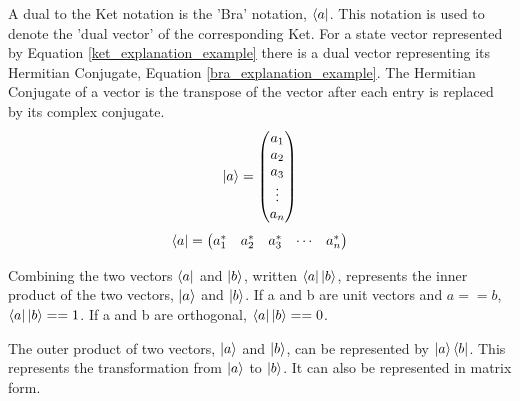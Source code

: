 A dual to the Ket notation is the 'Bra' notation, $\left\langle{a}\right\vert$.
This notation is used to denote the 'dual vector' of the corresponding Ket.
For a state vector represented by Equation \ref{ket_explanation_example} there is a dual vector representing its Hermitian Conjugate, Equation \ref{bra_explanation_example}.
The Hermitian Conjugate of a vector is the transpose of the vector after each entry is replaced by its complex conjugate.
\begin{equation}
\label{ket_explanation_example}
\left\vert{a}\right\rangle = 
\begin{pmatrix}
a_1\\
a_2\\
a_3\\
\vdots \\
a_n
\end{pmatrix}
\end{equation}
\begin{equation}
\label{bra_explanation_example}
\left\langle{a}\right\vert = 
\begin{pmatrix}
a_1^{*}&
a_2^{*}&
a_3^{*}&
\cdots &
a_n^{*}
\end{pmatrix}
\end{equation}

Combining the two vectors $\left\langle{a}\right\vert$ and $\left\vert{b}\right\rangle$, written $\left\langle{a}\right\vert\left\vert{b}\right\rangle$, represents the inner product of the two vectors, $\left\vert{a}\right\rangle$ and $\left\vert{b}\right\rangle$.
If a and b are unit vectors and $a == b$, $\left\langle{a}\right\vert\left\vert{b}\right\rangle == 1$.
If a and b are orthogonal, $\left\langle{a}\right\vert\left\vert{b}\right\rangle == 0$.

The outer product of two vectors, $\left\vert{a}\right\rangle$ and $\left\vert{b}\right\rangle$, can be represented by $\left\vert{a}\right\rangle\left\langle{b}\right\vert$.
This represents the transformation from $\left\vert{a}\right\rangle$ to $\left\vert{b}\right\rangle$.
It can also be represented in matrix form.

